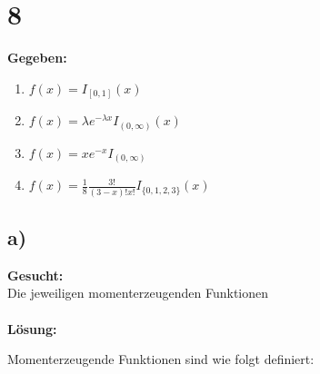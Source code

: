 \documentclass{article}
\begin{document}
\section*{8}
\textbf{Gegeben:}
\begin{enumerate}[label=\roman*)]
    \item $f(x) = I_{[0,1]}(x)$ \\
    \item $f(x) = \lambda e ^{-\lambda x}I_{(0, \infty)}(x)$ \\
    \item $f(x) = xe^{-x} I_{(0, \infty)}$ \\
    \item $f(x) = \frac{1}{8} \frac{3!}{(3-x)!x!}I_{\{0,1,2,3\}}(x)$ 
\end{enumerate}
\subsection*{a)}
\textbf{Gesucht:}\\

Die jeweiligen momenterzeugenden Funktionen \\ \\
\textbf{Lösung:}

Momenterzeugende Funktionen sind wie folgt definiert:
\end{document}

